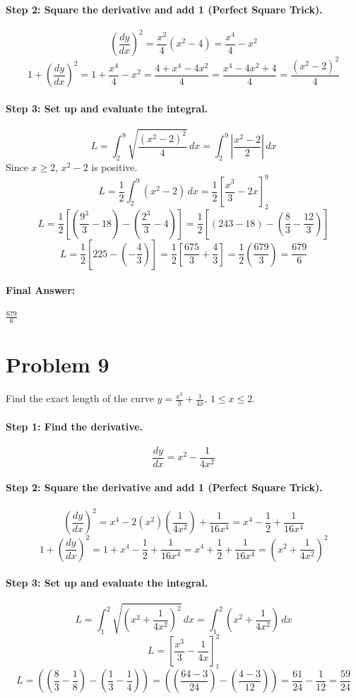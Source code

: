 \documentclass{article}
\begin{document}
\paragraph{Step 2: Square the derivative and add 1 (Perfect Square Trick).}
\[ (\frac{dy}{dx})^2 = \frac{x^2}{4}(x^2 - 4) = \frac{x^4}{4} - x^2 \]
\[ 1 + (\frac{dy}{dx})^2 = 1 + \frac{x^4}{4} - x^2 = \frac{4 + x^4 - 4x^2}{4} = \frac{x^4 - 4x^2 + 4}{4} = \frac{(x^2 - 2)^2}{4} \]

\paragraph{Step 3: Set up and evaluate the integral.}
\[ L = \int_{2}^{9} \sqrt{\frac{(x^2 - 2)^2}{4}} \,dx = \int_{2}^{9} |\frac{x^2 - 2}{2}| \,dx \]
Since $x \ge 2$, $x^2 - 2$ is positive.
\[ L = \frac{1}{2} \int_{2}^{9} (x^2 - 2) \,dx = \frac{1}{2} [\frac{x^3}{3} - 2x]_{2}^{9} \]
\[ L = \frac{1}{2} [ (\frac{9^3}{3} - 18) - (\frac{2^3}{3} - 4) ] = \frac{1}{2} [ (243 - 18) - (\frac{8}{3} - \frac{12}{3}) ] \]
\[ L = \frac{1}{2} [ 225 - (-\frac{4}{3}) ] = \frac{1}{2} [ \frac{675}{3} + \frac{4}{3} ] = \frac{1}{2}(\frac{679}{3}) = \frac{679}{6} \]

\paragraph{Final Answer:} $\frac{679}{6}$

\section*{Problem 9}
Find the exact length of the curve $y = \frac{x^3}{3} + \frac{1}{4x}$, $1 \le x \le 2$.

\paragraph{Step 1: Find the derivative.}
\[ \frac{dy}{dx} = x^2 - \frac{1}{4x^2} \]

\paragraph{Step 2: Square the derivative and add 1 (Perfect Square Trick).}
\[ (\frac{dy}{dx})^2 = x^4 - 2(x^2)(\frac{1}{4x^2}) + \frac{1}{16x^4} = x^4 - \frac{1}{2} + \frac{1}{16x^4} \]
\[ 1 + (\frac{dy}{dx})^2 = 1 + x^4 - \frac{1}{2} + \frac{1}{16x^4} = x^4 + \frac{1}{2} + \frac{1}{16x^4} = (x^2 + \frac{1}{4x^2})^2 \]

\paragraph{Step 3: Set up and evaluate the integral.}
\[ L = \int_{1}^{2} \sqrt{ (x^2 + \frac{1}{4x^2})^2 } \,dx = \int_{1}^{2} (x^2 + \frac{1}{4x^2}) \,dx \]
\[ L = [\frac{x^3}{3} - \frac{1}{4x}]_{1}^{2} \]
\[ L = ( (\frac{8}{3} - \frac{1}{8}) - (\frac{1}{3} - \frac{1}{4}) ) = ( (\frac{64-3}{24}) - (\frac{4-3}{12}) ) = \frac{61}{24} - \frac{1}{12} = \frac{59}{24} \]
\end{document}
